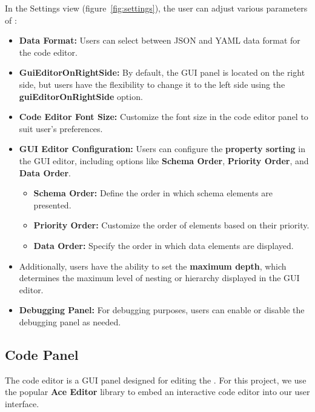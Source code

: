 In the Settings view (figure~\ref{fig:settings}), the user can adjust various parameters of \toolname{}:
\begin{itemize}
    \item \textbf{Data Format:} Users can select between JSON and YAML data format for the code editor.
    \item \textbf{GuiEditorOnRightSide:} By default, the GUI panel is located on the right side, but users have the flexibility to change it to the left side using the \textbf{guiEditorOnRightSide} option.
    \item \textbf{Code Editor Font Size:} Customize the font size in the code editor panel to suit user's preferences.
    \item \textbf{GUI Editor Configuration:} Users can configure the \textbf{property sorting} in the GUI editor, including options like \textbf{Schema Order}, \textbf{Priority Order}, and \textbf{Data Order}.
    \begin{itemize}
        \item \textbf{Schema Order:} Define the order in which schema elements are presented.
        \item \textbf{Priority Order:} Customize the order of elements based on their priority.
        \item \textbf{Data Order:} Specify the order in which data elements are displayed.
    \end{itemize}
    \item Additionally, users have the ability to set the \textbf{maximum depth}, which determines the maximum level of nesting or hierarchy displayed in the GUI editor.
    \item \textbf{Debugging Panel:} For debugging purposes, users can enable or disable the debugging panel as needed.
\end{itemize}


\subsection{Code Panel}\label{subsec:code-editor}

The code editor is a GUI panel designed for editing the \cfgfiles.
For this project, we use the popular \textbf{Ace Editor}\cite{Ace-Editor} library to embed an interactive code editor into our user interface.

